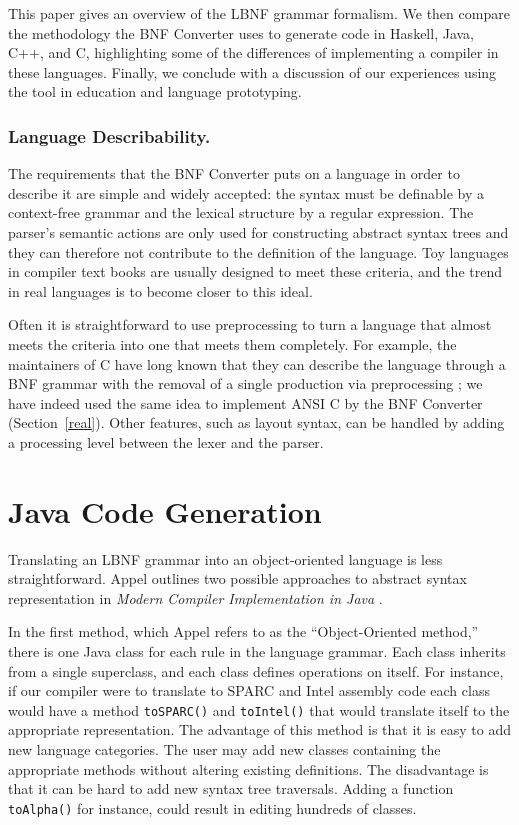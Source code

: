 \documentclass{llncs}
\newcommand{\shortsection}[1]{\subsubsection*{#1.}} %
\begin{document}
This paper gives an overview of the LBNF grammar formalism. We then compare the methodology the BNF Converter uses to generate code in Haskell, Java, C++, and C, highlighting some of the differences of implementing a compiler in these languages. Finally, we conclude with a discussion of our experiences using the tool in education and language prototyping.


\shortsection{Language Describability}

The requirements that the BNF Converter puts on a language in order to
describe it are simple and widely accepted: the syntax must be definable
by a context-free grammar and the lexical structure by a regular expression.
The parser's semantic actions are only used for constructing abstract 
syntax trees and they can therefore not contribute to the definition of 
the language. 
Toy languages in compiler text books are usually designed to meet these
criteria, and the trend in real languages is to become closer to this ideal.

Often it is straightforward to use preprocessing to turn a language that almost
meets the criteria into one that meets them completely.
For example, the maintainers of C have long known that they can describe 
the language through a BNF grammar with the removal of a single production 
via preprocessing \cite{Kern88}; we have indeed used the same idea to
implement ANSI C by the BNF Converter (Section~\ref{real}). 
Other features, such as layout syntax, can be handled by adding a 
processing level between the lexer and the parser.






\section{Java Code Generation}

Translating an LBNF grammar into an object-oriented language is less straightforward. Appel outlines two possible approaches to abstract syntax representation in \textit{Modern Compiler Implementation in Java} \cite{AppelJ}. 

In the first method, which Appel refers to as the ``Object-Oriented method,''
there is one Java class for each rule in the language grammar. Each class
inherits from a single superclass, and each class defines operations on itself.
For instance, if our compiler were to translate to SPARC and Intel assembly code
each class would have a method \texttt{toSPARC()} and \texttt{toIntel()} that would translate itself to the appropriate representation. The advantage of this method is that
it is easy to add new language categories. The user may add
new classes containing the appropriate methods without altering existing definitions. The
disadvantage is that it can be hard to add new syntax tree traversals.
Adding a function \texttt{toAlpha()} for instance, could result in editing hundreds of classes.
\end{document}
